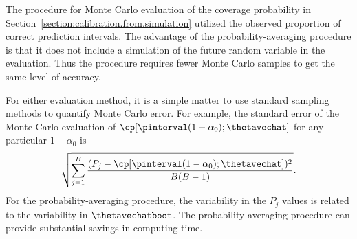 The procedure for Monte Carlo evaluation of the coverage probability
in Section~\ref{section:calibration.from.simulation} utilized the
observed proportion of correct prediction intervals. The advantage
of the probability-averaging procedure is that it does not include a
simulation of the future random variable in the evaluation.  Thus
the procedure requires fewer Monte Carlo samples to get the same
level of accuracy.

For either evaluation method, it is a simple matter to use standard
sampling methods to quantify Monte Carlo error. For example, the
standard error of the Monte Carlo evaluation of
$\cp[\pinterval(1-\alpha_{0}) ;\thetavechat]$ for any particular
$1-\alpha_{0}$ is
\begin{displaymath}
 \sqrt{ \sum_{j=1}^{B} \frac{ (P_{j} -
\cp[\pinterval(1-\alpha_{0});\thetavechat])^{2} }{B(B-1)}}.
\end{displaymath}
For the probability-averaging procedure, the variability in the
$P_{j}$ values is related to the variability in $\thetavechatboot$. The
probability-averaging procedure can provide substantial savings in
computing time.

